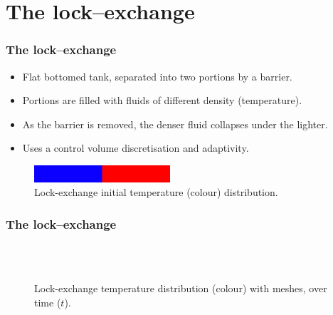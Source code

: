 \section{The lock--exchange}

\begin{frame}
    \frametitle{The lock--exchange}
\begin{itemize}
\item Flat bottomed tank, separated into two portions by a barrier.
\item Portions are filled with fluids of different density (temperature).
\item As the barrier is removed, the denser fluid collapses under the lighter.
\item Uses a control volume discretisation and adaptivity.
\end{itemize}

\begin{figure}
\centering
\includegraphics[width=0.45\textwidth]{./lock_exchange/le_basic_0_T}
\caption{Lock-exchange initial temperature (colour) distribution.}
\end{figure}

\end{frame}
%
\begin{frame}
    \frametitle{The lock--exchange}
\begin{figure}[ht]
  \centering
   \\
   \\
  \caption{Lock-exchange temperature distribution (colour) with meshes, over time ($t$).}
\end{figure}
\end{frame}
